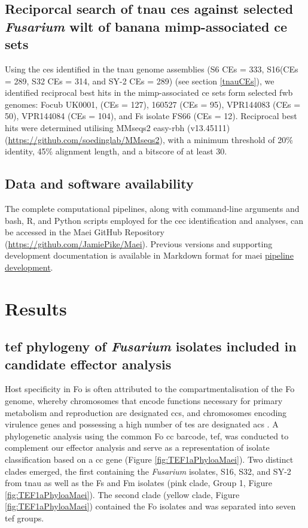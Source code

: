 \subsection{Reciporcal search of \ac{tnau} \aclp{ce} against selected \textit{Fusarium} wilt of banana \ac{mimp}-associated \ac{ce} sets}

Using the \acp{ce} identified in the  \ac{tnau} genome assemblies (S6 CEs = 333, S16(CEs = 289, S32 CEs = 314, and SY-2 CEs = 289) (see section \ref{tnauCEs}), we identified reciprocal best hits in the \ac{mimp}-associated \ac{ce} sets form selected \ac{fwb} genomes: \ac{Focub} UK0001, (CEs = 127), 160527 (CEs = 95), VPR144083 (CEs = 50), VPR144084 (CEs = 104), and \ac{Fs} isolate FS66 (CEs = 12).  Reciprocal best hits were determined utilising MMseqs2 easy-rbh (v13.45111) (\href{https://github.com/soedinglab/MMseqs2}{https://github.com/soedinglab/MMseqs2}),
with a minimum threshold of 20\% identity, 45\% alignment length, and a bitscore of at least 30.

\subsection{Data and software availability}

The complete computational pipelines, along with command-line arguments and bash, R, and Python scripts employed for the \ac{cec} identification and analyses, can be accessed in the Maei GitHub Repository (\href{https://github.com/JamiePike/Maei}{https://github.com/JamiePike/Maei}). Previous versions and supporting development documentation is available in Markdown format for \ac{maei} \href{https://github.com/JamiePike/Maei/tree/main/dev}{pipeline development}.

\newpage
\section{Results}

\subsection{\ac{tef} phylogeny of \textit{Fusarium} isolates included in candidate effector analysis}

Host specificity in \ac{Fo} is often attributed to the compartmentalisation of the \ac{Fo} genome, whereby chromosomes that encode functions necessary for primary metabolism and reproduction are designated \acfp{cc}, and chromosomes encoding virulence genes and possessing a high number of \acp{te} are designated \acfp{ac} \parencite{Ma2010, Dam2017}. A phylogenetic analysis using the common \ac{Fo} \ac{cc} barcode, \acf{tef}, was conducted to complement our effector analysis and serve as a representation of isolate classification based on a \ac{cc} gene (Figure \ref{fig:TEF1aPhyloaMaei}). Two distinct clades emerged, the first containing the \textit{Fusarium} isolates, S16, S32, and SY-2 from \ac{tnau} as well as the \acl{Fs} and \acl{Fm} isolates (pink clade, Group 1, Figure \ref{fig:TEF1aPhyloaMaei}). The second clade (yellow clade, Figure \ref{fig:TEF1aPhyloaMaei}) contained the \ac{Fo} isolates and was separated into seven \ac{tef} groups.  

